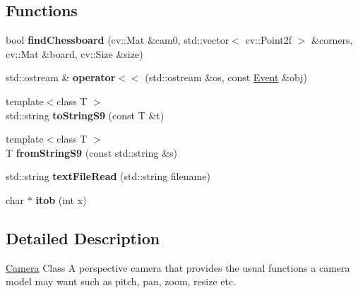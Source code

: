 \subsection*{\-Functions}
\begin{DoxyCompactItemize}
\item 
\hypertarget{namespaces9_a8b8b5ca9317d5e9a7026dc03d2fd1866}{bool {\bfseries find\-Chessboard} (cv\-::\-Mat \&cam0, std\-::vector$<$ cv\-::\-Point2f $>$ \&corners, cv\-::\-Mat \&board, cv\-::\-Size \&size)}\label{namespaces9_a8b8b5ca9317d5e9a7026dc03d2fd1866}

\item 
\hypertarget{namespaces9_ab92b827da3590481367cdc0160f7ffa3}{std\-::ostream \& {\bfseries operator$<$$<$} (std\-::ostream \&os, const \hyperlink{structs9_1_1Event}{\-Event} \&obj)}\label{namespaces9_ab92b827da3590481367cdc0160f7ffa3}

\item 
\hypertarget{namespaces9_ae0355e1e3080fef4ecc00e2d56e68485}{{\footnotesize template$<$class T $>$ }\\std\-::string {\bfseries to\-String\-S9} (const \-T \&t)}\label{namespaces9_ae0355e1e3080fef4ecc00e2d56e68485}

\item 
\hypertarget{namespaces9_ad07b19d428eddf62cd78b9188b714178}{{\footnotesize template$<$class T $>$ }\\\-T {\bfseries from\-String\-S9} (const std\-::string \&s)}\label{namespaces9_ad07b19d428eddf62cd78b9188b714178}

\item 
\hypertarget{namespaces9_a59dc39969cfc135e714655dcbd685cd2}{std\-::string {\bfseries text\-File\-Read} (std\-::string filename)}\label{namespaces9_a59dc39969cfc135e714655dcbd685cd2}

\item 
\hypertarget{namespaces9_a23dbe14204162b4e6204035bc48b3bb0}{char $\ast$ {\bfseries itob} (int x)}\label{namespaces9_a23dbe14204162b4e6204035bc48b3bb0}

\end{DoxyCompactItemize}


\subsection{\-Detailed \-Description}
\hyperlink{classs9_1_1Camera}{\-Camera} \-Class \-A perspective camera that provides the usual functions a camera model may want such as pitch, pan, zoom, resize etc.

